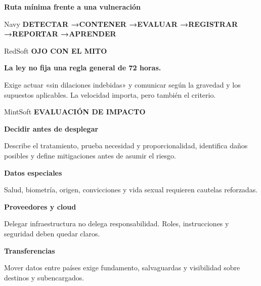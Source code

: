 \documentclass[11pt,a4paper]{article}
\newcommand{\eyebrow}[1]{\fontsize{8.5}{10}\selectfont\bfseries\color{Red}\MakeUppercase{#1}}
\newcommand{\cardtitle}[1]{\fontsize{10}{12}\selectfont\bfseries\color{Charcoal}#1}
\newcommand{\smallcopy}[1]{\fontsize{9.8}{13}\selectfont\color{Charcoal}#1}
\newcommand{\twocol}[2]{%
  \begin{minipage}[t]{0.485\textwidth}#1\end{minipage}\hfill
  \begin{minipage}[t]{0.485\textwidth}#2\end{minipage}
}
\newcommand{\threecol}[3]{%
  \begin{minipage}[t]{0.316\textwidth}#1\end{minipage}\hfill
  \begin{minipage}[t]{0.316\textwidth}#2\end{minipage}\hfill
  \begin{minipage}[t]{0.316\textwidth}#3\end{minipage}
}
\begin{document}
\vspace{6mm}
\cardtitle{Ruta mínima frente a una vulneración}\par\vspace{3mm}
\begin{softcard}{Navy}
  \color{White}\centering
  \fontsize{10}{13}\selectfont\bfseries
  DETECTAR \quad→\quad CONTENER \quad→\quad EVALUAR \quad→\quad REGISTRAR \quad→\quad REPORTAR \quad→\quad APRENDER
\end{softcard}

\vspace{6mm}
\twocol{
  \begin{softcard}{RedSoft}
    \eyebrow{Ojo con el mito}\par\vspace{2mm}
    \fontsize{17}{20}\selectfont\bfseries\color{RedDark}La ley no fija una regla general de 72 horas.\par\vspace{2mm}
    \smallcopy{Exige actuar «sin dilaciones indebidas» y comunicar según la gravedad y los supuestos aplicables. La velocidad importa, pero también el criterio.}
  \end{softcard}
}{
  \begin{softcard}{MintSoft}
    \eyebrow{Evaluación de impacto}\par\vspace{2mm}
    \fontsize{17}{20}\selectfont\bfseries\color{Navy}Decidir antes de desplegar\par\vspace{2mm}
    \smallcopy{Describe el tratamiento, prueba necesidad y proporcionalidad, identifica daños posibles y define mitigaciones antes de asumir el riesgo.}
  \end{softcard}
}

\vspace{6mm}
\begin{card}
  \threecol{
    \cardtitle{Datos especiales}\par\vspace{2mm}\smallcopy{Salud, biometría, origen, convicciones y vida sexual requieren cautelas reforzadas.}
  }{
    \cardtitle{Proveedores y cloud}\par\vspace{2mm}\smallcopy{Delegar infraestructura no delega responsabilidad. Roles, instrucciones y seguridad deben quedar claros.}
  }{
    \cardtitle{Transferencias}\par\vspace{2mm}\smallcopy{Mover datos entre países exige fundamento, salvaguardas y visibilidad sobre destinos y subencargados.}
  }
\end{card}
\newpage
\end{document}

